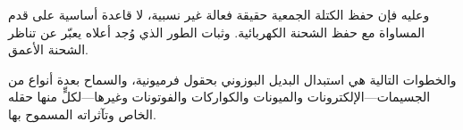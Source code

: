 وعليه فإن حفظ الكتلة الجمعية حقيقة فعالة غير نسبية، لا قاعدة أساسية على قدم المساواة مع حفظ الشحنة الكهربائية. وثبات الطور الذي وُجد أعلاه يعبّر عن تناظر الشحنة الأعمق.

والخطوات التالية هي استبدال البديل البوزوني بحقول فرميونية، والسماح بعدة أنواع من الجسيمات---الإلكترونات والميونات والكواركات والفوتونات وغيرها---لكلٍّ منها حقله الخاص وتآثراته المسموح بها.

\begin{classroomqa}
\end{classroomqa}